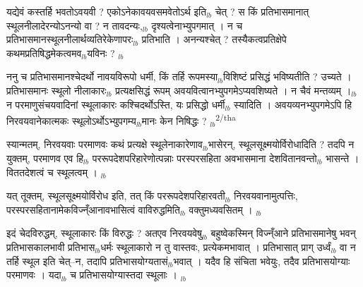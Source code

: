 \documentclass[article,12pt,a4paper]{memoir}%
\newcounter{parCount}
\begin{document}
	  
	  \pstart \leavevmode%
	यद्येवं कस्तर्हि भवतोऽवयवी ? एकोऽनेकावयवसमवेतोऽर्थ इति{\tiny $_{lb}$} चेत् ? स किं प्रतिभासमानात् स्थूलनीलादेरन्योऽनन्यो वा ? न तावदन्यः,{\tiny $_{lb}$} दृश्यत्वेनाभ्युपगमात् । न च प्रतिभासमानस्थूलनीलार्थव्यतिरेकेणापरः{\tiny $_{lb}$} प्रतिभाति । अनन्यश्चेत् ? तस्यैकत्वप्रतिक्षेपे कथमप्रतिषिद्धमेकत्वमव{\tiny $_{lb}$}यविनः ?
	{}
	\pend%
      {\tiny $_{lb}$}

	  
	  \pstart \leavevmode%
	ननु च प्रतिभासमानश्चेदर्थो नावयविरूपो धर्मी, किं तर्हि रूपमस्या{\tiny $_{lb}$}विशिष्टं प्रसिद्धं भविष्यतीति ? उच्यते । प्रतिभासमानः स्थूलो नीलाकारः{\tiny $_{lb}$} प्रत्यक्षसिद्धं रूपम् अवयवित्वानभ्युपगमेऽप्यवशिष्यते । न चैवं मन्तव्यम् ।{\tiny $_{lb}$} न परमाणुसंचयवादिनां स्थूलाकारः कश्चिदर्थोऽस्ति, यः प्रसिद्धो धर्मी{\tiny $_{lb}$} स्यादिति । अवयव्यनभ्युपगमेऽपि हि निरवयवानेकात्मकः स्थूलोऽर्थोऽभ्युपगम्य{\tiny $_{lb}$}मानः केन निषिद्धः ?
	{}
	\pend%
      {\tiny $_{lb}$}\textsuperscript{\textenglish{2/tha}}

	  
	  \pstart \leavevmode%
	स्यान्मतम्, निरवयवाः परमाणवः कथं प्रत्यक्षे स्थूलेनाकारेणाव{\tiny $_{lb}$}भासेरन्, स्थूलसूक्ष्मयोर्विरोधादिति ? तदपि न युक्तम्, परमाणव एव हि{\tiny $_{lb}$} पररूपदेशपरिहारेणोत्पन्नाः परस्परसहिता अवभासमाना देशवितानवन्तो{\tiny $_{lb}$} भासन्ते । विततदेशत्वं च स्थूलत्वम् ।
	{}
	\pend%
      {\tiny $_{lb}$}

	  
	  \pstart \leavevmode%
	यत् तूक्तम्, स्थूलसूक्ष्मयोर्विरोध इति, तत् किं पररूपदेशपरिहारवती{\tiny $_{lb}$} निरवयवानामुत्पत्तिः, परस्परसहितानामेकविज्न्ँआनावभासित्वं वाविरुद्धमिति{\tiny $_{lb}$} वक्तुमध्यवसितम् ।
	{}
	\pend%
      {\tiny $_{lb}$}

	  
	  \pstart \leavevmode%
	इदं चेदविरुद्धम्, स्थूलाकारः किं विरुद्धः ? अतएव निरवयवेषु{\tiny $_{lb}$} बहुष्वेकस्मिन् विज्न्ँआने प्रतिभासमानेषु भवन् प्रतिभासकालभावी प्रतिभास{\tiny $_{lb}$}धर्मः स्थूलाकारो न तु वास्तवः, प्रत्येकमभावात् । प्रतिभासात् प्राग् उर्ध्वं{\tiny $_{lb}$} वा न तर्हि स्थूल इति चेत्--न, तदापि प्रतिभासयोग्यतासं\leavevmode{}{\tiny $_{lb}$}भवात् । यदैव हि संचिता भवेयुः, तदैव प्रतिभासयोग्याः परमाणवः । यदा{\tiny $_{lb}$} च प्रतिभासयोग्यास्तदा स्थूलाः ।
	{}
	\pend%
      {\tiny $_{lb}$}
\end{document}
